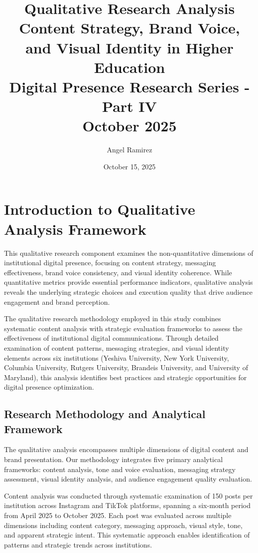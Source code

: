 \documentclass[12pt]{report}
\title{
    \Huge\textbf{Qualitative Research Analysis}\\[1cm]
    \Large\textbf{Content Strategy, Brand Voice, and Visual Identity in Higher Education}\\[0.5cm]
    \large Digital Presence Research Series - Part IV\\[1cm]
    \normalsize October 2025
}
\author{Angel Ramirez}
\date{October 15, 2025}
\begin{document}
\maketitle

\tableofcontents

\chapter{Introduction to Qualitative Analysis Framework}

This qualitative research component examines the non-quantitative dimensions of institutional digital presence, focusing on content strategy, messaging effectiveness, brand voice consistency, and visual identity coherence. While quantitative metrics provide essential performance indicators, qualitative analysis reveals the underlying strategic choices and execution quality that drive audience engagement and brand perception.

The qualitative research methodology employed in this study combines systematic content analysis with strategic evaluation frameworks to assess the effectiveness of institutional digital communications. Through detailed examination of content patterns, messaging strategies, and visual identity elements across six institutions (Yeshiva University, New York University, Columbia University, Rutgers University, Brandeis University, and University of Maryland), this analysis identifies best practices and strategic opportunities for digital presence optimization.

\section{Research Methodology and Analytical Framework}

The qualitative analysis encompasses multiple dimensions of digital content and brand presentation. Our methodology integrates five primary analytical frameworks: content analysis, tone and voice evaluation, messaging strategy assessment, visual identity analysis, and audience engagement quality evaluation.

Content analysis was conducted through systematic examination of 150 posts per institution across Instagram and TikTok platforms, spanning a six-month period from April 2025 to October 2025. Each post was evaluated across multiple dimensions including content category, messaging approach, visual style, tone, and apparent strategic intent. This systematic approach enables identification of patterns and strategic trends across institutions.
\end{document}
